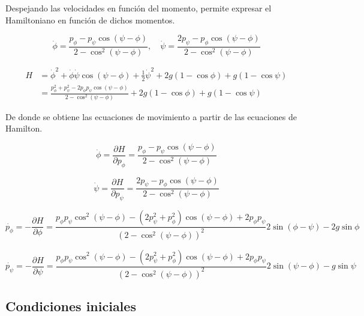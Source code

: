 \documentclass[11pt, twoside]{article} %
\begin{document}
Despejando las velocidades en función del momento, permite expresar el 
Hamiltoniano en función de dichos momentos.

\begin{equation}
    \dot{\phi} = \frac{p_\phi - p_\psi\cos(\psi - \phi)}{2-\cos^2(\psi - \phi)}, \quad 
    \dot{\psi} = \frac{2p_\psi - p_\phi\cos(\psi - \phi)}{2-\cos^2(\psi - \phi)}
\end{equation}

\begin{equation}
    \begin{split}
        H &= \dot{\phi}^2 + \dot{\phi}\dot{\psi} \cos(\psi - \phi) +
\frac{1}{2}\dot{\psi}^2 + 2g(1-\cos\phi) + g(1-\cos\psi)  \\
 &=\frac{p_\phi^2 + p_\psi^2 - 2p_\phi p_\psi \cos(\psi - \phi)}{2-\cos^2(\psi - \phi)} + 2g(1-\cos\phi) + g(1-\cos\psi)
    \end{split}
\end{equation}

De donde se obtiene las ecuaciones de movimiento a partir de las 
ecuaciones de Hamilton.

\begin{equation}
        \dot{\phi} = \frac{\partial H}{\partial p_\phi} = \frac{p_\phi - p_\psi\cos(\psi - \phi)}{2-\cos^2(\psi - \phi)} 
\end{equation}

\begin{equation}
    \dot{\psi} = \frac{\partial H}{\partial p_\psi} = \frac{2p_\psi - p_\phi\cos(\psi - \phi)}{2-\cos^2(\psi - \phi)}
\end{equation}

\begin{equation}
    \dot{p_\phi} = -\frac{\partial H}{\partial \phi} =  \frac{p_\phi p_\psi \cos^2(\psi - \phi) - (2p_\psi^2 + p_\phi^2)\cos(\psi - \phi) + 2p_\phi p_\psi }{(2-\cos^2(\psi - \phi))^2}2\sin(\phi - \psi) -2g\sin\phi
\end{equation}

\begin{equation}
    \dot{p_\psi} = -\frac{\partial H}{\partial \psi} =  \frac{p_\phi p_\psi \cos^2(\psi - \phi) - (2p_\psi^2 + p_\phi^2)\cos(\psi - \phi) + 2p_\phi p_\psi }{(2-\cos^2(\psi - \phi))^2}2\sin(\psi - \phi) -g\sin\psi
\end{equation}

\subsection{Condiciones iniciales}
\end{document}
